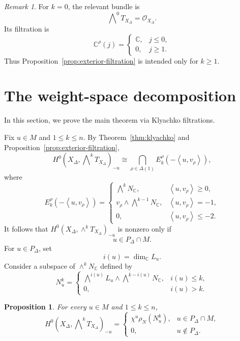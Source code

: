 \documentclass[colorlinks,11pt,reqno]{amsart}
\newtheorem{proposition}[theorem]{Proposition}
\theoremstyle{definition}
\theoremstyle{remark}
\newtheorem{remark}[theorem]{Remark}
\numberwithin{equation}{section}
\numberwithin{equation}{section}
\newcommand{\CC}{\mathbb{C}}
\newcommand{\Pair}[2]{\left\langle #1,#2\right\rangle}
\newcommand{\C}{\mathbb{C}}
\begin{document}
\begin{remark}\label{rem:k-zero}
For \(k=0\), the relevant bundle is
\[
\bigwedge\nolimits^0T_{X_\Delta} = \mathcal{O}_{X_\Delta}.
\]
Its filtration is
\[
\C^\rho(j) =
\begin{cases}
\C,&j\leq0,\\
0,&j\geq1.
\end{cases}
\]
Thus Proposition~\ref{prop:exterior-filtration} is intended only for \(k\geq1\).
\end{remark}

\section{The weight-space decomposition}\label{sec:weights}
In this section, we prove the main theorem via Klyachko filtrations.

Fix \(u\in M\) and \(1\leq k\leq n\). By Theorem~\ref{thm:klyachko} and Proposition~\ref{prop:exterior-filtration},
\[
H^0\!\left(X_\Delta,\bigwedge\nolimits^kT_{X_\Delta} \right)_{-u}
\cong  \bigcap_{\rho\in\Delta(1)} E_k^\rho\!\left(-\Pair{u}{v_\rho}\right),
\]
where
\begin{equation}\label{eq:ray-condition}
E_k^\rho\!\left(-\Pair{u}{v_\rho}\right) =
\begin{cases}
\bigwedge^kN_{\CC},
&\Pair{u}{v_\rho}\geq0,\\[4pt]
v_\rho\wedge\bigwedge^{k-1}N_{\CC},
&\Pair{u}{v_\rho}=-1,\\[4pt]
0,
&\Pair{u}{v_\rho}\leq-2.
\end{cases}
\end{equation}
It follows that $H^0\left(X_\Delta,\wedge^k T_{X_\Delta} \right)_{-u}$ is nonzero only if
\[
u\in P_\Delta\cap M.
\]
For \(u\in P_\Delta\), set
\[
i(u)=\dim_{\CC}L_u.
\]
Consider a subspace of $\wedge^k N_\C$ defined by
\[
N_u^k =
\begin{cases}
\displaystyle
\bigwedge\nolimits^{i(u)}L_u
\wedge
\bigwedge\nolimits^{k-i(u)}N_{\CC},
&i(u)\leq k,\\[6pt]
0,&i(u)>k.
\end{cases}
\]

\begin{proposition}\label{prop:individual-weight}
For every \(u\in M\) and \(1\leq k\leq n\),
\[
H^0\!\left( X_\Delta,\bigwedge\nolimits^kT_{X_\Delta} \right)_{-u}
=
\begin{cases}
\chi^u\rho_N(N_u^k),
&u\in P_\Delta\cap M,\\[4pt]
0,&u\notin P_\Delta.
\end{cases}
\]
\end{proposition}
\end{document}
